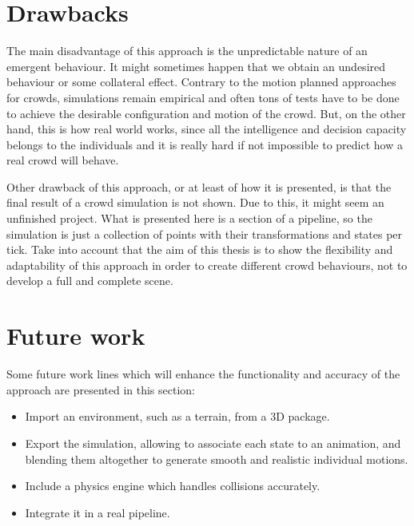 \section{Drawbacks}

The main disadvantage of this approach is the unpredictable nature of an emergent behaviour. It might sometimes happen that we obtain an undesired behaviour or some collateral effect. Contrary to the motion planned approaches for crowds, simulations remain empirical and often tons of tests have to be done to achieve the desirable configuration and motion of the crowd. But, on the other hand, this is how real world works, since all the intelligence and decision capacity belongs to the individuals and it is really hard if not impossible to predict how a real crowd will behave.

Other drawback of this approach, or at least of how it is presented, is that the final result of a crowd simulation is not shown. Due to this, it might seem an unfinished project. What is presented here is a section of a pipeline, so the simulation is just a collection of points with their transformations and states per tick. Take into account that the aim of this thesis is to show the flexibility and adaptability of this approach in order to create different crowd behaviours, not to develop a full and complete scene.

\newpage
\section{Future work}

Some future work lines which will enhance the functionality and accuracy of the approach are presented in this section:

\begin{itemize}
\item Import an environment, such as a terrain, from a 3D package.
\item Export the simulation, allowing to associate each state to an animation, and blending them altogether to generate smooth and realistic individual motions.
\item Include a physics engine which handles collisions accurately.
\item Integrate it in a real pipeline.
\end{itemize}


\ifx\isEmbedded\undefined


\pagebreak

\fi